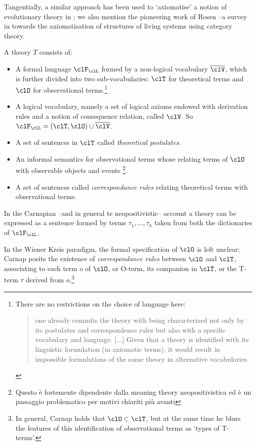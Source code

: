 Tangentially, a similar approach has been used to `axiomatise' a notion of evolutionary theory in \cite{biologia}; we also mention the pioneering work of Rosen --a survey in \cite{letelier2006organizational} towards the axiomatisation of structures of living systems using category theory.
\begin{definition} \cite{krause-foundation}
	A theory $T$ consists of:
	\begin{itemize}
	\item A formal language $\clF_\clL$ formed by a non-logical vocabulary $\overline{\clV}$, which is further divided into two sub-vocabularies: $\clT$ for theoretical terms and $\clO$ for observational terms.\footnote{There are no restrictions on the choice of language here:
	\begin{quotation}
		one already commits the theory with being characterized not only by its postulates and correspondence rules but also with a specific vocabulary and language. [...] Given that a theory is identified with its linguistic formulation (in axiomatic terms), it would result in impossible formulations of the same theory in alternative vocabularies. \hspace{\fill}\cite{krause-foundation}
	\end{quotation}}
	\item A logical vocabulary, namely a set of logical axioms endowed with derivation rules and a notion of consequence relation, called $\clV$. So $\clF_\clL= (\clT,\clO) \cup \overline{\clV}$.
	\item A set of sentences in $\clT$ called \emph{theoretical postulates}.
	\item An informal semantics for observational terms whose relating terms of $\clO$ with observable objects and events \footnote{Questo è fortemente dipendente dalla meaning theory neopositivistica \cite{} ed è un passaggio problematico per motivi chiariti più avanti}. 
	\item A set of sentences called \emph{correspondance rules} relating theoretical terms with observational terms. 
	\end{itemize}    
\end{definition}
In the Carnapian --and in general te neopositivistic-- account a theory can be expressed as a sentence formed by terms $\tau_1, \dots, \tau_k$ taken from both the dictionaries of $\clF_\clL$. 

In the Wiener Kreis paradigm, the formal specification of $\clO$ is left unclear; Carnap \cite{carnapfound} posits the existence of \emph{correspondance rules} between $\clO$ and $\clT$, associating to each term $o$ of $\clO$, or O-term, its companion in $\clT$, or the T-term $\tau$ derived from $o$.\footnote{In general, Carnap holds that $\clO \subset \clT$, but at the same time he blurs the features of this identification of observational terms as `types of T-terms'.}

